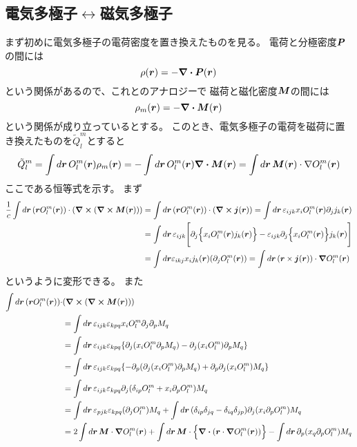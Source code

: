 \documentclass[../../master.tex]{subfiles}
\begin{document}
\subsection{電気多極子\(\leftrightarrow\)磁気多極子}
まず初めに電気多極子の電荷密度を置き換えたものを見る。
電荷と分極密度\(\vb*{P}\)の間には
\begin{equation}
    \rho(\vb*{r}) = -\div\vb*{P}(\vb*{r})
\end{equation}
という関係があるので、これとのアナロジーで
磁荷と磁化密度\(\vb*{M}\)の間には
\begin{equation}
    \rho_m(\vb*{r}) = -\div\vb*{M}(\vb*{r})
\end{equation}
という関係が成り立っているとする。
このとき、電気多極子の電荷を磁荷に置き換えたものを\(\tilde{Q}_l^m\)とすると
\begin{align}
    \tilde{Q}_l^m
    = \int d\vb*{r}\, O_l^m(\vb*{r})\rho_m(\vb*{r})
    = -\int d\vb*{r}\, O_l^m(\vb*{r})\div\vb*{M}(\vb*{r})
    = \int d\vb*{r}\, \vb*{M}(\vb*{r})\cdot \nabla O_l^m(\vb*{r})
\end{align}
ここである恒等式を示す。
まず
\begin{align}
    \frac{1}{c}\int d\vb*{r}\, (\vb*{r}O_l^m(\vb*{r}))\cdot (\curl (\curl\vb*{M}(\vb*{r})))
    &=\int d\vb*{r}\, (\vb*{r}O_l^m(\vb*{r}))\cdot(\curl \vb*{j}(\vb*{r}))
    =\int d\vb*{r}\, \varepsilon_{ijk} x_i O_l^m(\vb*{r}) \partial_j j_k(\vb*{r})\\
    &= \int d\vb*{r}\,\varepsilon_{ijk} \Biggl[\partial_j \Bigl\{ x_i O_l^m(\vb*{r}) j_k(\vb*{r})\Bigr\}
    -  \varepsilon_{ijk}\partial_j\Bigl\{x_i O_l^m(\vb*{r})\Bigr\} j_k(\vb*{r})\Biggr]\\
    &=\int d\vb*{r}\varepsilon_{ikj} x_i j_k(\vb*{r}) (\partial_j O_l^m(\vb*{r}))
    =\int d\vb*{r}\, (\vb*{r}\times\vb*{j}(\vb*{r}))\cdot \grad O_l^m(\vb*{r})
\end{align}
というように変形できる。
また
\begin{align}
    \int d\vb*{r}\, (\vb*{r}O_l^m(\vb*{r}))\cdot&(\curl (\curl\vb*{M}(\vb*{r}))) \notag\\
    &=\int d\vb*{r}\, \varepsilon_{ijk}\varepsilon_{kpq} x_i O_l^m \partial_j \partial_p M_q\\
    &=\int d\vb*{r}\, \varepsilon_{ijk}\varepsilon_{kpq}
    \qty{\partial_j(x_i O_l^m \partial_p M_q)-\partial_j(x_i O_l^m)\partial_p M_q}\\
    &=\int d\vb*{r}\, \varepsilon_{ijk}\varepsilon_{kpq}
    \qty{-\partial_p(\partial_j(x_i O_l^m)\partial_p M_q)+ \partial_p\partial_j(x_iO_l^m)M_q}\\
    &=\int d\vb*{r}\, \varepsilon_{ijk}\varepsilon_{kpq}
    \partial_j(\delta_{ip}O_l^m + x_i\partial_pO_l^m)M_q\\
    &=\int d\vb*{r}\, \varepsilon_{pjk}\varepsilon_{kpq} (\partial_j O_l^m)M_q
    +\int d\vb*{r}\, (\delta_{ip}\delta_{jq}-\delta_{iq}\delta_{jp})\partial_j(x_i\partial_p O_l^m)M_q\\
    &=2\int d\vb*{r}\, \vb*{M}\cdot\grad O_l^m(\vb*{r})
    + \int d\vb*{r}\, \vb*{M} \cdot \Bigl\{\div(\vb*{r}\cdot \grad O_l^m(\vb*{r}))\Bigr\}
    -\int d\vb*{r}\, \partial_p(x_q\partial_p O_l^m) M_q
\end{align}
\end{document}
